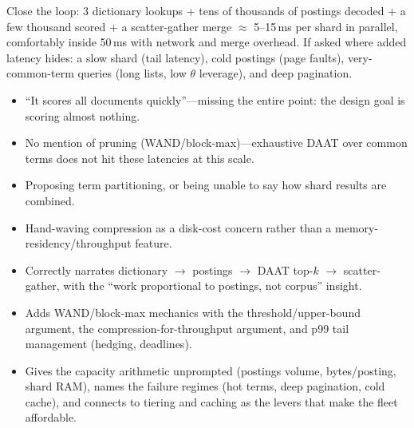 \begin{interviewq}
Close the loop: 3 dictionary lookups + tens of thousands of postings decoded + a few thousand scored + a scatter-gather merge $\approx$ 5--15\,ms per shard in parallel, comfortably inside 50\,ms with network and merge overhead. If asked where added latency hides: a slow shard (tail latency), cold postings (page faults), very-common-term queries (long lists, low $\theta$ leverage), and deep pagination.

\redflags
\begin{itemize}
    \item ``It scores all documents quickly''---missing the entire point: the design goal is scoring almost nothing.
    \item No mention of pruning (WAND/block-max)---exhaustive DAAT over common terms does not hit these latencies at this scale.
    \item Proposing term partitioning, or being unable to say how shard results are combined.
    \item Hand-waving compression as a disk-cost concern rather than a memory-residency/throughput feature.
\end{itemize}


\goodgreat
\begin{itemize}
    \item {} Correctly narrates dictionary $\rightarrow$ postings $\rightarrow$ DAAT top-$k$ $\rightarrow$ scatter-gather, with the ``work proportional to postings, not corpus'' insight.
    \item {} Adds WAND/block-max mechanics with the threshold/upper-bound argument, the compression-for-throughput argument, and p99 tail management (hedging, deadlines).
    \item {} Gives the capacity arithmetic unprompted (postings volume, bytes/posting, shard RAM), names the failure regimes (hot terms, deep pagination, cold cache), and connects to tiering and caching as the levers that make the fleet affordable.
\end{itemize}

\end{interviewq}

